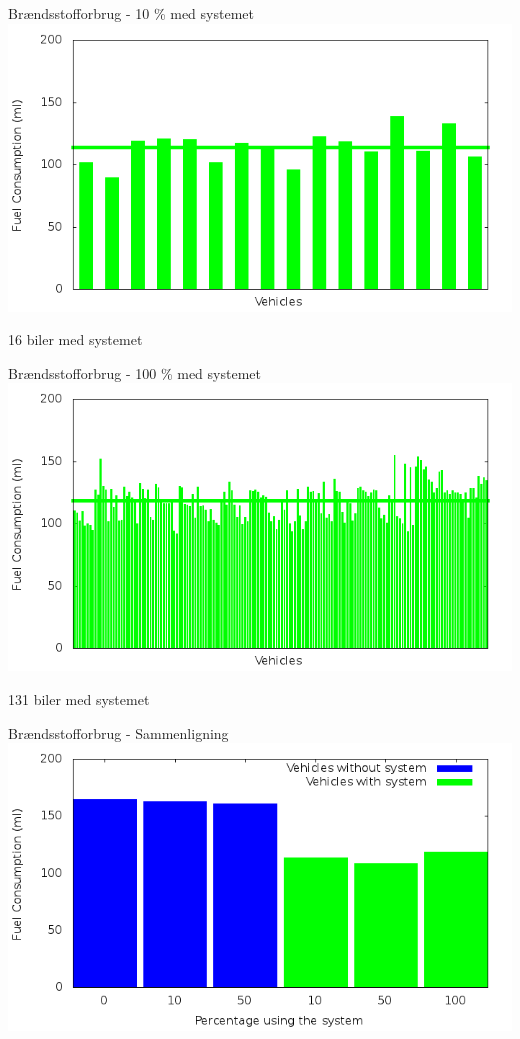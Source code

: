 \begin{frame}{Brændsstofforbrug - 10 \% med systemet}
\includegraphics[width=1\textwidth]{../images/tp0c1_0/fuelRouteControlled10.png}

16 biler med systemet
\end{frame}

\begin{frame}{Brændsstofforbrug - 100 \% med systemet}
\includegraphics[width=1\textwidth]{../images/tp0c1_0/fuelRouteControlled100.png}

131 biler med systemet
\end{frame}

\begin{frame}{Brændsstofforbrug - Sammenligning}
\includegraphics[width=1\textwidth]{../images/tp0c1_0/combinedFuel.png}
\end{frame}

